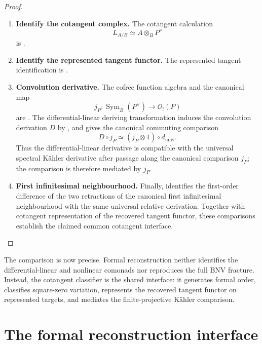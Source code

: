 \begin{proof}
\leavevmode
\begin{enumerate}[label=\textup{(\arabic*)}]
    \item \textbf{Identify the cotangent complex.}
    The cotangent calculation
    \[
        L_{A/B}\simeq A\otimes_BP^\vee
    \]
    is .
    \item \textbf{Identify the represented tangent functor.}
    The represented tangent identification is .
    \item \textbf{Convolution derivative.}
    The cofree function algebra and the canonical map
    \[
        j_P:
        \operatorname{Sym}_B(P^\vee)\longrightarrow\mathcal O_!(P)
    \]
    are . The differential-linear deriving
    transformation induces the convolution derivation \(D\) by
    , and
     gives the canonical commuting comparison
    \[
        D\circ j_P
        \simeq
        (j_P\otimes1)\circ d_{\mathrm{univ}}.
    \]
    Thus the differential-linear derivative is compatible with the universal
    spectral K\"ahler derivative after passage along the canonical comparison
    \(j_P\); the comparison is therefore mediated by \(j_P\).
    \item \textbf{First infinitesimal neighbourhood.}
    Finally,
     identifies the
    first-order difference of the two retractions of the canonical first
    infinitesimal neighbourhood with the same universal relative derivation.
    Together with cotangent representation of the recovered tangent functor,
    these comparisons establish the claimed common cotangent interface.
\end{enumerate}
\end{proof}



The comparison is now precise. Formal reconstruction neither identifies the
differential-linear and nonlinear comonads nor reproduces the full BNV fracture.
Instead, the cotangent classifier is the shared interface: it generates formal order,
classifies square-zero variation, represents the recovered tangent functor on
represented targets, and mediates the finite-projective K\"ahler comparison.

\section{The formal reconstruction interface}
\label{sec:formal-reconstruction-interface}

